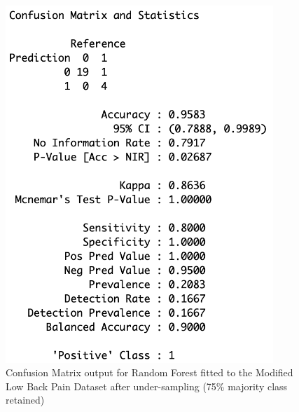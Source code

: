 \begin{figure}[!htbp]
\begin{minipage}{0.45\textwidth}
        \includegraphics[width=0.9\textwidth]{ThesisTemplate/appendix/images/Chapter5Appendix/ConfusionMatrix75/ModifiedLBP.png}
        \caption{Confusion Matrix output for Random Forest fitted to the Modified Low Back Pain Dataset after under-sampling (75\% majority class retained)}
        \label{fig:matrixmodLBP75}
    \end{minipage}
\end{figure}

